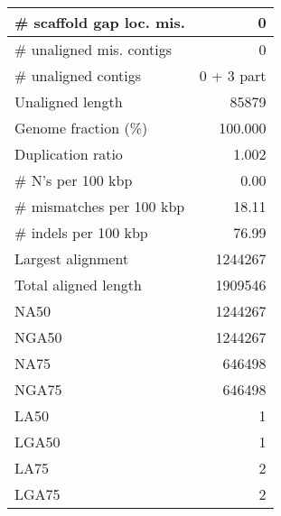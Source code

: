 \documentclass[12pt,a4paper]{article}
\begin{document}
\begin{table}[ht]
\begin{center}
\begin{tabular}{|l*{1}{|r}|}
\# scaffold gap loc. mis. & 0 \\ \hline
\# unaligned mis. contigs & 0 \\ \hline
\# unaligned contigs & 0 + 3 part \\ \hline
Unaligned length & 85879 \\ \hline
Genome fraction (\%) & 100.000 \\ \hline
Duplication ratio & 1.002 \\ \hline
\# N's per 100 kbp & 0.00 \\ \hline
\# mismatches per 100 kbp & 18.11 \\ \hline
\# indels per 100 kbp & 76.99 \\ \hline
Largest alignment & 1244267 \\ \hline
Total aligned length & 1909546 \\ \hline
NA50 & 1244267 \\ \hline
NGA50 & 1244267 \\ \hline
NA75 & 646498 \\ \hline
NGA75 & 646498 \\ \hline
LA50 & 1 \\ \hline
LGA50 & 1 \\ \hline
LA75 & 2 \\ \hline
LGA75 & 2 \\ \hline
\end{tabular}
\end{center}
\end{table}
\end{document}
